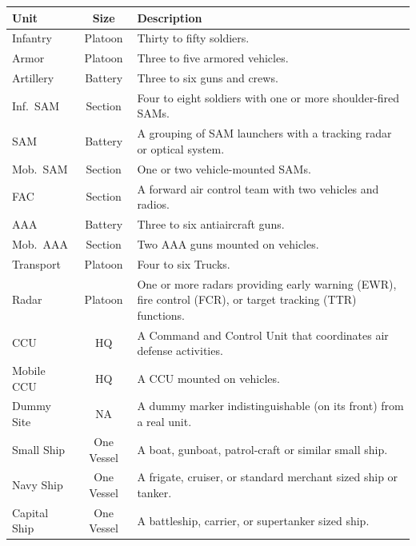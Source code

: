 
\begin{onecolumntablefloat}[t]
\begin{onecolumntable}

\begin{tabularx}{\linewidth}{lcP}
\toprule
Unit&Size&Description\\
\midrule
Infantry        &Platoon    &Thirty to fifty soldiers.\\
Armor           &Platoon    &Three to five armored vehicles.\\
Artillery	    &Battery	&Three to six guns and crews.\\
Inf.\ SAM	    &Section	&Four to eight soldiers with one or more shoulder-fired SAMs.\\
SAM	            &Battery    &A grouping of SAM launchers with a tracking radar or optical system.\\
Mob.\ SAM	    &Section	&One or two vehicle-mounted SAMs.\\
FAC	            &Section	&A forward air control team with two vehicles and radios.\\
AAA	            &Battery	&Three to six antiaircraft guns.\\
Mob.\ AAA	    &Section	&Two AAA guns mounted on vehicles.\\
Transport	    &Platoon	&Four to six Trucks.\\
Radar	        &Platoon	&One or more radars providing early warning (EWR), fire control (FCR), or target tracking (TTR) functions.\\
CCU	            &HQ	        &A Command and Control Unit that coordinates air defense activities.\\
Mobile CCU	    &HQ	        &A CCU mounted on vehicles.\\
Dummy Site	    &NA	        &A dummy marker indistinguishable (on its front) from a real unit.\\
Small Ship	    &One Vessel	&A boat, gunboat, patrol-craft or similar small ship.\\
Navy Ship	    &One Vessel	&A frigate, cruiser, or standard merchant sized ship or tanker.\\
Capital Ship	&One Vessel	&A battleship, carrier, or supertanker sized ship.\\
\bottomrule
\end{tabularx}

\end{onecolumntable}
\end{onecolumntablefloat}


